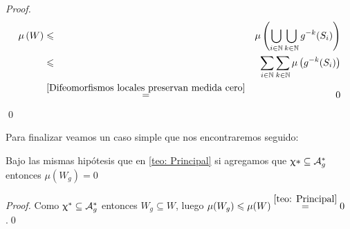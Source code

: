 \begin{proof}
	\begin{equation*}
	\begin{aligned}
	\mu \left(W\right) & \le & \mu \left(\Bigcup{i \in \N}{\Bigcup{k \in \N}{g^{-k}(S_i)}} \right) \\
	& \le & \Bigsum{i \in \N}{\Bigsum{k \in \N}{\mu \left(g^{-k}(S_i)\right)}} \\
	& \stackrel{\ref{Difeomorfismos locales preservan medida cero}}{=} & 0
	\end{aligned}
	\end{equation*}\qed
	
	
\end{proof}

Para finalizar veamos un caso simple que nos encontraremos seguido:

\begin{corollary}
	\label{coro: Resultado principal}
	Bajo las mismas hip\'otesis que en \ref{teo: Principal} si agregamos que $\mani* \subseteq \puntosfijos$ entonces $\mu(W_g) =0$
\end{corollary}

\begin{proof}
	Como $\mani^* \subseteq \puntosfijos$ entonces $W_g \subseteq W$, luego $\mu(W_g) \le \mu (W) \stackrel{\ref{teo: Principal}}{=} 0$.\qed
\end{proof}